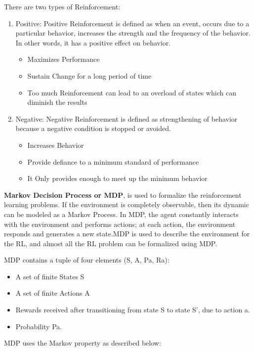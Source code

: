 \documentclass[12pt,a4paper]{report}
\begin{document}
There are two types of Reinforcement:  
\begin{enumerate}

    \item Positive: Positive Reinforcement is defined as when an event, occurs due to a particular behavior, increases the strength and the frequency of the behavior. In other words, it has a positive effect on behavior.
\begin{itemize}
\renewcommand\labelitemi{--}
\item Maximizes Performance
\item Sustain Change for a long period of time
\item Too much Reinforcement can lead to an overload of states which can diminish the results\\
\end{itemize}
\item Negative: Negative Reinforcement is defined as strengthening of behavior because a negative condition is stopped or avoided. 
\begin{itemize}
\renewcommand\labelitemi{--}
\item Increases Behavior
\item Provide defiance to a minimum standard of performance
\item It Only provides enough to meet up the minimum behavior
\end{itemize}
\end{enumerate}
\vspace{1cm}
 \textbf{Markov Decision Process or MDP}, is used to formalize the reinforcement learning problems. If the environment is completely observable, then its dynamic can be modeled as a Markov Process. In MDP, the agent constantly interacts with the environment and performs actions; at each action, the environment responds and generates a new state.MDP is used to describe the environment for the RL, and almost all the RL problem can be formalized using MDP.

MDP contains a tuple of four elements (S, A, Pa, Ra):
\begin{itemize}
\item A set of finite States S
\item A set of finite Actions A
\item Rewards received after transitioning from state S to state S', due to action a.
\item Probability Pa.
\end{itemize}
MDP uses the Markov property as described below:\\
\end{document}
